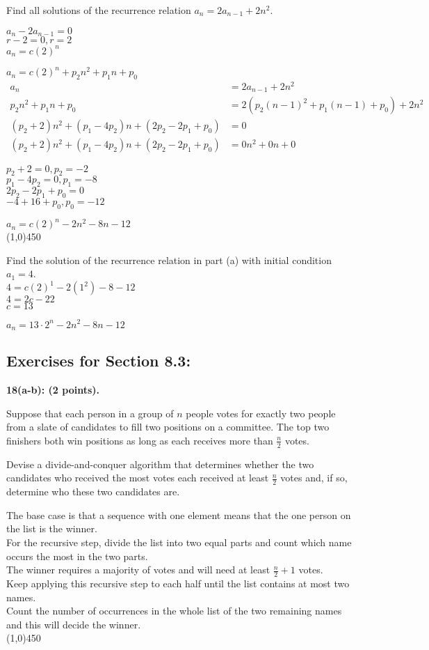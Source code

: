\documentclass[12pt]{article}  %
\begin{document}
\noindent
Find all solutions of the recurrence relation $a_n=2a_{n-1}+2n^2$.

\noindent
$a_n-2a_{n-1}=0$\\
$r-2=0,r=2$\\
$a_n=c(2)^n$

\noindent
$a_n=c(2)^n+p_2n^2+p_1n+p_0$
\begin{align*}
a_n             &= 2a_{n-1}+2n^2                    \\
p_2n^2+p_1n+p_0 &= 2(p_2(n-1)^2+p_1(n-1)+p_0)+2n^2  \\
(p_2+2)n^2+(p_1-4p_2)n+(2p_2-2p_1+p_0) &= 0         \\
(p_2+2)n^2+(p_1-4p_2)n+(2p_2-2p_1+p_0) &= 0n^2+0n+0
\end{align*}

\noindent
$p_2+2=0,p_2=-2$\\
$p_1-4p_2=0,p_1=-8$\\
$2p_2-2p_1+p_0=0$\\
$-4+16+p_0,p_0=-12$

\noindent
$a_n=c(2)^n-2n^2-8n-12$\\
\line(1,0){450}

\noindent
Find the solution of the recurrence relation in part (a) with initial condition $a_1=4$.\\
$4=c(2)^1-2(1^2)-8-12$\\
$4=2c-22$\\
$c=13$

\noindent
$a_n=13\cdot2^n-2n^2-8n-12$

\clearpage
\subsection*{Exercises for Section 8.3:}     
\noindent
{\bf 18(a-b): (2 points).}

\noindent
Suppose that each person in a group of $n$ people votes for exactly two people from a slate of candidates to fill two positions on a committee. The top two finishers both win positions as long as each receives more than $\displaystyle\frac{n}{2}$ votes.

\noindent
Devise a divide-and-conquer algorithm that determines whether the two candidates who received the most votes each received at least $\displaystyle\frac{n}{2}$ votes and, if so, determine who these two candidates are.

\noindent
The base case is that a sequence with one element means that the one person on the list is the winner.\\
For the recursive step, divide the list into two equal parts and count which name occurs the most in the two parts.\\
The winner requires a majority of votes and will need at least $\displaystyle\frac{n}{2}+1$ votes.\\
Keep applying this recursive step to each half until the list contains at most two names.\\
Count the number of occurrences in the whole list of the two remaining names and this will decide the winner.\\
\line(1,0){450}
\end{document}
